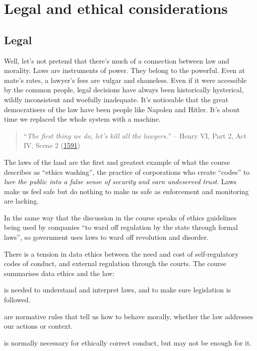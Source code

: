 \documentclass[
]{book}
\providecommand{\tightlist}{%
  \setlength{\itemsep}{0pt}\setlength{\parskip}{0pt}}
\begin{document}
\hypertarget{legal-and-ethical-considerations}{%
\section{Legal and ethical considerations}\label{legal-and-ethical-considerations}}

\hypertarget{legal}{%
\subsection{Legal}\label{legal}}

Well, let's not pretend that there's much of a connection between law and morality. Laws are instruments of power. They belong to the powerful. Even at mate's rates, a lawyer's fees are vulgar and shameless. Even if it were accessible by the common people, legal decisions have always been historically hysterical, wildly inconsistent and woefully inadequate. It's noticeable that the great democratisers of the law have been people like Napolen and Hitler. It's about time we replaced the whole system with a machine.

\begin{quote}
``\emph{The first thing we do, let's kill all the lawyers.}'' -- Henry VI, Part 2, Act IV, Scene 2 (\protect\hyperlink{ref-Shakespeare}{1591})
\end{quote}

The laws of the land are the first and greatest example of what the course describes as ``ethics washing'', the practice of corporations who create ``codes'' to \emph{lure the public into a false sense of security and earn undeserved trust}. Laws make us feel safe but do nothing to make us safe as enforcement and monitoring are lacking.

In the same way that the discussion in the course speaks of ethics guidelines being used by companies ``to ward off regulation by the state through formal laws'', so government uses laws to ward off revolution and disorder.

There is a tension in data ethics between the need and cost of self-regulatory codes of conduct, and external regulation through the courts. The course summarises data ethics and the law:

\begin{description}
\tightlist
\item[Hard ethics]
is needed to understand and interpret laws, and to make sure legislation is followed.
\item[Soft ethics]
are normative rules that tell us how to behave morally, whether the law addresses our actions or context.
\item[Compliance with the law]
is normally necessary for ethically correct conduct, but may not be enough for it.
\end{description}
\end{document}

